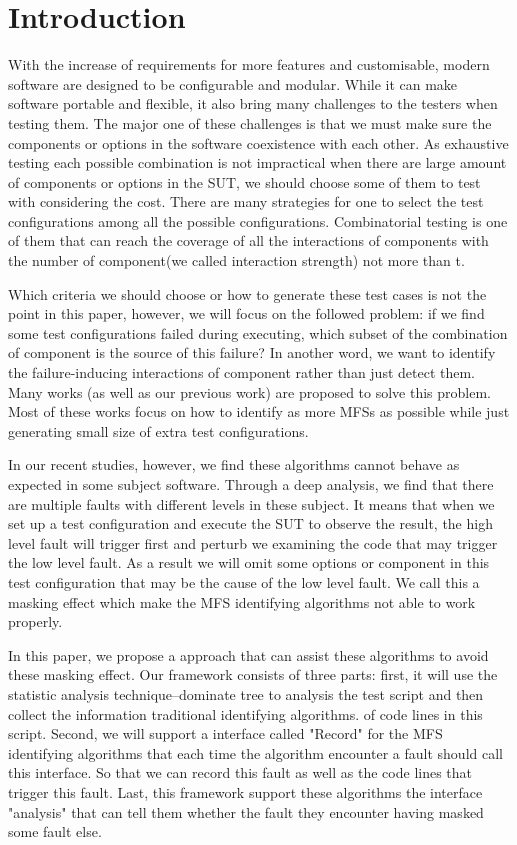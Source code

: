 \documentclass{sig-alternate}
\begin{document}
\section{Introduction}
With the increase of requirements for more features and customisable, modern software are designed to be configurable and modular. While it can make software portable and flexible, it also bring many challenges to the testers when testing them. The major one of these challenges is that we must make sure the components or options in the software coexistence with each other. As exhaustive testing each possible combination is not impractical when there are large amount of components or options in the SUT, we should choose some of them to test with considering the cost. There are many strategies for one to select the test configurations among all the possible configurations. Combinatorial testing is one of them that can reach the coverage of all the interactions of components with the number of component(we called interaction strength) not more than t.

Which criteria we should choose or how to generate these test cases is not the point in this paper, however, we will focus on the followed problem: if we find some test configurations failed during executing, which subset of the combination of component is the source of this failure?  In another word, we want to identify the failure-inducing interactions of component rather than just detect them. Many works (as well as our previous work) are proposed to solve this problem. Most of these works focus on how to identify as more MFSs as possible while just generating small size of extra test configurations.

In our recent studies, however, we find these algorithms cannot behave as expected in some subject software. Through a deep analysis, we find that there are multiple faults with different levels in these subject. It means that when we set up a test configuration and execute the SUT to observe the result, the high level fault will trigger first and perturb we examining the code that may trigger the low level fault. As a result we will omit some options or component in this test configuration that may be the cause of the low level fault. We call this a masking effect which make the MFS identifying algorithms not able to work properly.

In this paper, we propose a approach that can assist these algorithms to avoid these masking effect. Our framework consists of three parts: first, it will use the statistic analysis technique--dominate tree to analysis the test script and then collect the information
traditional identifying algorithms. of code lines in this script. Second, we will support a interface called "Record" for the MFS identifying algorithms that each time the algorithm encounter a fault should call this interface. So that we can record this fault as well as the code lines that trigger this fault. Last, this framework support these algorithms the interface "analysis" that can tell them whether the fault they encounter having masked some fault else.
\end{document}
